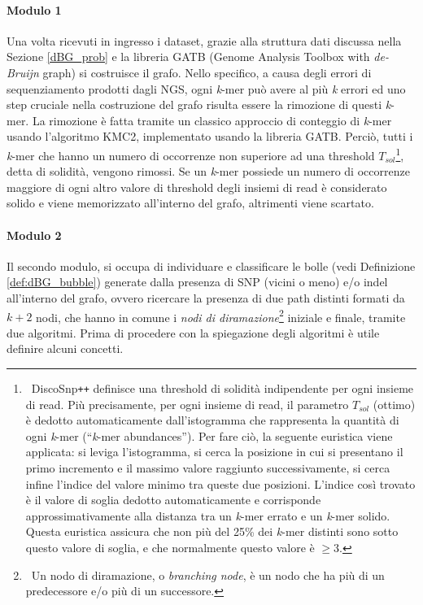 \documentclass[../main.tex]{subfiles}
\begin{document}
\paragraph{Modulo 1} Una volta ricevuti in ingresso i dataset, grazie alla struttura dati discussa nella Sezione \ref{dBG_prob} e la libreria GATB (Genome Analysis Toolbox with \textit{de-Bruijn} graph) si costruisce il grafo. Nello specifico, a causa degli errori di sequenziamento prodotti dagli NGS, ogni \textit{k}-mer può avere al più \textit{k} errori ed uno step cruciale nella costruzione del grafo risulta essere la rimozione di questi \textit{k}-mer. La rimozione è fatta tramite un classico approccio di conteggio di \textit{k}-mer usando l'algoritmo KMC2, implementato usando la libreria GATB. Perciò, tutti i \textit{k}-mer che hanno un numero di occorrenze non superiore ad una threshold $T_{sol}$\footnote{\ DiscoSnp\texttt{++} definisce una threshold di solidità indipendente per ogni insieme di read. Più precisamente, per ogni insieme di read, il parametro $T_{sol}$ (ottimo) è dedotto automaticamente dall'istogramma che rappresenta la quantità di ogni \textit{k}-mer (``\textit{k}-mer abundances''). Per fare ciò, la seguente euristica viene applicata: si leviga l'istogramma, si cerca la posizione in cui si presentano il primo incremento e il massimo valore raggiunto successivamente, si cerca infine l'indice del valore minimo tra queste due posizioni. L'indice così trovato è il valore di soglia dedotto automaticamente e corrisponde approssimativamente alla distanza tra un \textit{k}-mer errato e un \textit{k}-mer solido. Questa euristica assicura che non più del 25\% dei \textit{k}-mer distinti sono sotto questo valore di soglia, e che normalmente questo valore è $\geq3$.}, detta di solidità, vengono rimossi. Se  un \textit{k}-mer possiede un numero di occorrenze maggiore di ogni altro valore di threshold degli insiemi di read è considerato solido e viene memorizzato all'interno del grafo, altrimenti viene scartato.

\paragraph{Modulo 2} Il secondo modulo, si occupa di individuare e classificare le bolle (vedi Definizione \ref{def:dBG_bubble}) generate dalla presenza di SNP (vicini o meno) e/o indel all'interno del grafo, ovvero ricercare la presenza di due path distinti formati da $k+2$ nodi, che hanno in comune i \textit{nodi di diramazione}\footnote{\ Un nodo di diramazione, o \textit{branching node}, è un nodo che ha più di un predecessore e/o più di un successore.} iniziale e finale, tramite due algoritmi. Prima di procedere con la spiegazione degli algoritmi è utile definire alcuni concetti.
\end{document}

